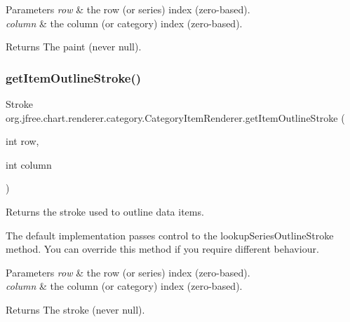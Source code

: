 \begin{DoxyParams}{Parameters}
{\em row} & the row (or series) index (zero-\/based). \\
\hline
{\em column} & the column (or category) index (zero-\/based).\\
\hline
\end{DoxyParams}
\begin{DoxyReturn}{Returns}
The paint (never {\ttfamily null}). 
\end{DoxyReturn}
\mbox{\label{interfaceorg_1_1jfree_1_1chart_1_1renderer_1_1category_1_1_category_item_renderer_ad7517f4cb86d699eeda551e819aa162d}} 
\subsubsection{\texorpdfstring{get\+Item\+Outline\+Stroke()}{getItemOutlineStroke()}}
{\footnotesize\ttfamily Stroke org.\+jfree.\+chart.\+renderer.\+category.\+Category\+Item\+Renderer.\+get\+Item\+Outline\+Stroke (\begin{DoxyParamCaption}\item[{int}]{row,  }\item[{int}]{column }\end{DoxyParamCaption})}

Returns the stroke used to outline data items. 

The default implementation passes control to the lookup\+Series\+Outline\+Stroke method. You can override this method if you require different behaviour.


\begin{DoxyParams}{Parameters}
{\em row} & the row (or series) index (zero-\/based). \\
\hline
{\em column} & the column (or category) index (zero-\/based).\\
\hline
\end{DoxyParams}
\begin{DoxyReturn}{Returns}
The stroke (never {\ttfamily null}). 
\end{DoxyReturn}
\mbox{\label{interfaceorg_1_1jfree_1_1chart_1_1renderer_1_1category_1_1_category_item_renderer_a535682d438117db613e8e0840fb1d7bd}} 
